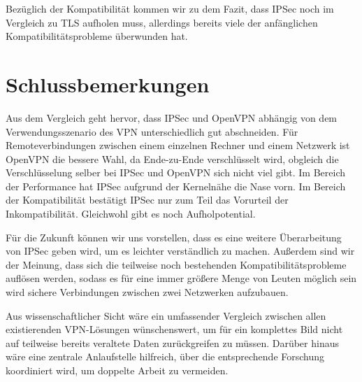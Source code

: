 \documentclass[12pt]{scrartcl}
\begin{document}
Bezüglich der Kompatibilität kommen wir zu dem Fazit, dass IPSec noch im Vergleich zu TLS aufholen muss, allerdings bereits viele der anfänglichen Kompatibilitätsprobleme überwunden hat.

\section{Schlussbemerkungen}
Aus dem Vergleich geht hervor, dass IPSec und OpenVPN abhängig von dem Verwendungsszenario des VPN unterschiedlich gut abschneiden. Für Remoteverbindungen zwischen einem einzelnen Rechner und einem Netzwerk ist OpenVPN die bessere Wahl, da Ende-zu-Ende verschlüsselt wird, obgleich die Verschlüsselung selber bei IPSec und OpenVPN sich nicht viel gibt. Im Bereich der Performance hat IPSec aufgrund der Kernelnähe die Nase vorn. Im Bereich der Kompatibilität bestätigt IPSec nur zum Teil das Vorurteil der Inkompatibilität. Gleichwohl gibt es noch Aufholpotential.

Für die Zukunft können wir uns vorstellen, dass es eine weitere Überarbeitung von IPSec geben wird, um es leichter verständlich zu machen. Außerdem sind wir der Meinung, dass sich die teilweise noch bestehenden Kompatibilitätsprobleme auflösen werden, sodass es für eine immer größere Menge von Leuten möglich sein wird sichere Verbindungen zwischen zwei Netzwerken aufzubauen.

Aus wissenschaftlicher Sicht wäre ein umfassender Vergleich zwischen allen existierenden VPN-Lösungen wünschenswert, um für ein komplettes Bild nicht auf teilweise bereits veraltete Daten zurückgreifen zu müssen. Darüber hinaus wäre eine zentrale Anlaufstelle hilfreich, über die entsprechende Forschung koordiniert wird, um doppelte Arbeit zu vermeiden.

\newpage

\printbibliography
{}


\newpage
{}
\end{document}
